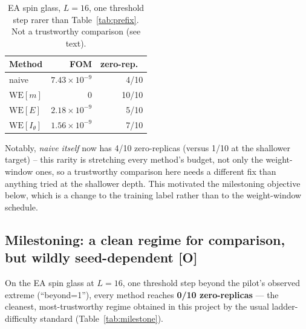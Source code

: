 \documentclass[a4paper,fleqn]{cas-sc}
\begin{document}
\begin{table}[H]
\centering\small
\caption{EA spin glass, $L=16$, one threshold step rarer than Table~\ref{tab:prefix}. Not a
	trustworthy comparison (see text).}
\label{tab:beyond2}
\begin{tabular}{lrr}
	\toprule
	Method & FOM & zero-rep.\ \\
	\midrule
	naive & $7.43\times10^{-9}$ & 4/10 \\
	$\mathrm{WE}[m]$ & $0$ & 10/10 \\
	$\mathrm{WE}[E]$ & $2.18\times10^{-9}$ & 5/10 \\
	$\mathrm{WE}[I_\theta]$ & $1.56\times10^{-9}$ & 7/10 \\
	\bottomrule
\end{tabular}
\end{table}

Notably, \emph{naive itself} now has 4/10 zero-replicas (versus 1/10 at the shallower
target) -- this rarity is stretching every method's budget, not only the weight-window
ones, so a trustworthy comparison here needs a different fix than anything tried at the
shallower depth. This motivated the milestoning objective below, which is a change to the
training label rather than to the weight-window schedule.

\subsection{Milestoning: a clean regime for comparison, but wildly seed-dependent \textbf{[O]}}\label{sec:milestone}
On the EA spin glass at $L=16$, one threshold step beyond the pilot's observed extreme
(``beyond=1''), every method reaches \textbf{0/10 zero-replicas} --- the cleanest,
most-trustworthy regime obtained in this project by the usual ladder-difficulty standard
(Table~\ref{tab:milestone}).
\end{document}

